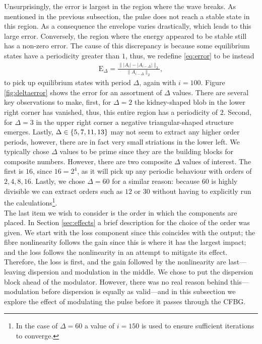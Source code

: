 \documentclass[10pt,twocolumn,a4paper]{article}
\let\originalleft\left
\let\originalright\right
\renewcommand{\left}{\mathopen{}\mathclose\bgroup\originalleft}
\renewcommand{\right}{\aftergroup\egroup\originalright}
\begin{document}
Unsurprisingly, the error is largest in the region where the wave breaks. As mentioned in the previous subsection, the pulse does not reach a stable state in this region. As a consequence the envelope varies drastically, which leads to this large error. Conversely, the region where the energy appeared to be stable still has a non-zero error. The cause of this discrepancy is because some equilibrium states have a periodicity greater than $1$, thus, we redefine \eqref{eq:error} to be instead
\begin{align}
\textrm{E}_\Delta = \frac{\| |A_i| - |A_{i-\Delta}| \|_2}{\| A_{i-\Delta} \|_2},
\label{eq:deltaerror}
\end{align}
to pick up equilibrium states with period $\Delta$, again with $i = 100$. Figure \ref{fig:deltaerror} shows the error for an assortment of $\Delta$ values. There are several key observations to make, first, for $\Delta = 2$ the kidney-shaped blob in the lower right corner has vanished, thus, this entire region has a periodicity of $2$. Second, for $\Delta = 3$ in the upper right corner a negative triangular-shaped structure emerges. Lastly, $\Delta \in \left\{ 5, 7, 11, 13 \right\}$ may not seem to extract any higher order periods, however, there are in fact very small striations in the lower left. We typically chose $\Delta$ values to be prime since they are the building blocks for composite numbers. However, there are two composite $\Delta$ values of interest. The first is $16$, since $16 = 2^4$, as it will pick up any periodic behaviour with orders of $2, 4, 8, 16$. Lastly, we chose $\Delta = 60$ for a similar reason: because $60$ is highly divisible we can extract orders such as $12$ or $30$ without having to explicitly run the calculations\footnote{In the case of $\Delta = 60$ a value of $i = 150$ is used to ensure sufficient iterations to converge.}. \\





The last item we wish to consider is the order in which the components are placed. In Section \ref{sec:effects} a brief description for the choice of the order was given. We start with the loss component since this coincides with the output; the fibre nonlinearity follows the gain since this is where it has the largest impact; and the loss follows the nonlinearity in an attempt to mitigate its effect. Therefore, the loss is first, and the gain followed by the nonlinearity are last---leaving dispersion and modulation in the middle. We chose to put the dispersion block ahead of the modulator. However, there was no real reason behind this---modulation before dispersion is equally as valid---and in this subsection we explore the effect of modulating the pulse before it passes through the CFBG. \\
\end{document}
